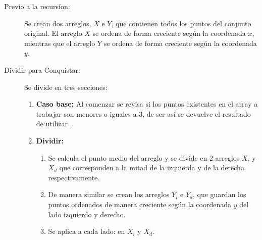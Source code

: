 \documentclass[main.tex]{subfiles}
\begin{document}
\begin{description}
	\item[Previo a la recursíon:]
	      Se crean dos arreglos, $X$ e $Y$, que contienen todos los puntos del conjunto original.
	      El arreglo $X$ se ordena de forma creciente según la coordenada $x$, mientras que el
	      arreglo $Y$ se ordena de forma creciente según la coordenada $y$.

	\item[Dividir para Conquistar:]
	      Se divide en tres secciones:
	      \begin{enumerate}
		      \item \textbf{Caso base:}
		            Al comenzar se revisa si los puntos existentes en el array a trabajar son
		            menores o iguales a 3, de ser así se devuelve el resultado de
		            utilizar .
		      \item \textbf{Dividir:}
		            \begin{enumerate}
			            \item Se calcula el punto medio del arreglo y se divide en 2 arreglos
			                  $X_i$ y $X_d$ que corresponden a la mitad de la izquierda y de la
			                  derecha respectivamente.

			            \item De manera similar se crean los arreglos $Y_i$ e $Y_d$, que guardan
			                  los puntos ordenados de manera creciente según la coordenada $y$ del
			                  lado izquierdo y derecho.

			            \item Se aplica  a cada lado: en $X_i$ y $X_d$.


\end{enumerate}
\end{enumerate}
\end{description}
\end{document}
